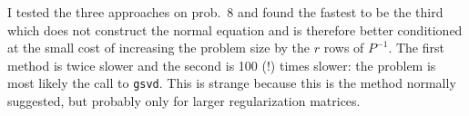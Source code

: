 \begin{enumerate}
    I tested the three approaches on prob.~8 and found the fastest to be the third which does not construct the normal equation and is therefore better conditioned at the small cost of increasing the problem size by the $r$ rows of $P^{-1}$. The first method is twice slower and the second is 100 (!) times slower: the problem is most likely the call to \texttt{gsvd}. This is strange because this is the method normally suggested, but probably only for larger regularization matrices.
  \end{enumerate}


